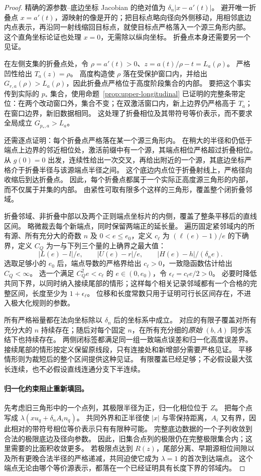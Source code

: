 \begin{proof}
精确的源参数--底边坐标 Jacobian 的绝对值为 $\delta_n|x-a'(t)|$。
避开唯一折叠点 $x=a'(t)$，源映射的像是开的；把目标点略向径向外侧移动，用相邻底边内点表示，再沿同一射线缩回目标点，就使目标点严格落入一个源三角形内部。
这个直角坐标论证也处理 $x=0$，无需除以纵向坐标。
折叠点本身还需要另一个见证。

在左侧支集的折叠点处，令 $\rho=a'(t)>0$、$z=a(t)/\rho-t=L_a(\rho)$。
严格凹性给出 $T_a(z)=\rho$。
高度构造使 $\rho$ 落在受保护窗口内，并给出 $G_{r,a}(\rho)>L_a(\rho)$，因此折叠点严格位于高度阶段集合的内部。
要把这个事实传到实际的 $p_*$ 集合，使用命题~\ref{prop:upper-longitudinal} 已证明的完整条带定位：在两个改动窗口外，集合不变；在双激活窗口内，新上边界仍严格高于 $T_a$；在窗口边界，新旧数据相同。
这处理了折叠相位及其带符号等价表示，而不要求全局成立 $G_{p_*,a}>L_a$。

还需逐点证明：每个折叠点严格落在某一个源三角形内。
在稍大的半径和仍低于端点上边界的邻近相位处，激活前缀中有一个源，其端点相位严格超过折叠相位。
从 $g(0)=0$ 出发，连续性给出一次交叉，再给出附近的一个源，其底边坐标严格介于折叠半径与该源端点半径之间。
这个底边内点位于折叠射线上，严格径向收缩后到达折叠点。
因此，每个折叠点都属于一个实际正高度源三角形的内部，而不仅属于并集的内部。
由紧性可取有限多个这样的三角形，覆盖整个闭折叠邻域。

折叠邻域、非折叠中部以及两个正则端点坐标片的内侧，覆盖了整条平移后的直线区间。
略微裁去每个新端点，同时保留两端正的延长量。
遍历固定紧邻域内的所有源、所有充分大的奇数 $n$ 及 $0<e\le e_0$，定义 $c_\ell$ 为 $(\ell(e)-1)/e$ 的下确界，定义 $C_Q$ 为一与下列三个量的上确界之最大值：
\[
 |L(e)-l|/e,\qquad |U(e)-r|/e,\qquad |H(e)-h|/(\delta_n e).
\]
选取足够小的 $e_0$ 后，端点导数的严格界给出 $c_\ell>0$，一致隐函数估计给出 $C_Q<\infty$。
选一个满足 $C_Q^2e<c_\ell$ 的 $e\in(0,e_0)$，令 $\epsilon_\ell=c_\ell e/2>0$。
必要时降低共同下界，以同时纳入接续尾部的情形；这样每个相关记录邻域都有一个合格的完整区间，长度至少为 $1+\epsilon_\ell$。
位移和长度常数只用于证明可行长区间存在，不进入极大化规则的参数。

所有严格裕量都在法向坐标除以 $\delta_n$ 后的坐标系中成立。
对应的有限子覆盖对所有充分大的 $n$ 持续存在；随后对每个固定 $n$，在所有充分细的\emph{原始} $(b,A)$ 同步冻结下也持续存在。
两侧闭标签都满足同一组一致端点误差和归一化高度误差界。
接续尾部的情形按定义保留原线段，只有连接处和新增部分需要严格见证。
平移情形则为裁短后的整个区间提供这种见证。
有限覆盖已经足够；不必假设最大弦长连续，也不必假设直线连通分支下半连续。

\paragraph{归一化约束阻止重新填回。}
先考虑旧三角形中的一个点列，其极限半径为正，归一化相位位于 $Z$。
把每个点写成 $\lambda(xu_q+\delta_n A_i n_q)$。
共同外界和正半径使 $|x|$ 与零保持距离，$A_i$ 又有界，因此相对的带符号相位等价表示只有有限种可能。
完整底边数据的一个子列收敛到合法的极限底边及径向参数。
因此，旧集合点列的极限仍在完整极限集合内；这里需要的比面积收敛更多。
若极限点达到 $R(z)$，尾部分离、早期源相位间隙以及所有更晚合法半径的严格递减，共同迫使它成为 $\lambda=1$ 的首次到达端点。
这个端点无论由哪个等价源表示，都落在一个已经证明具有长度下界的邻域内。


\end{proof}
